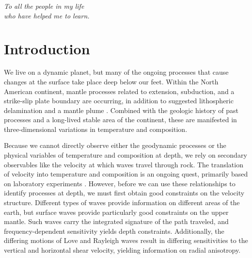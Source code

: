 \documentclass[12pt,oneside]{book}
\begin{document}
\pagebreak

\vspace*{\fill}
\begin{center}
\begingroup
\emph{To all the people in my life \\
who have helped me to learn.\\
}
\endgroup
\end{center}
\vspace*{\fill}

\raggedbottom
\pagebreak

\mainmatter

\singlespacing
\chapter{Introduction}
\label{ch:intro}
\doublespacing

\pagestyle{fancy}
\chead{}
\cfoot{\thepage}
\renewcommand{\headrulewidth}{0pt} %
\thispagestyle{fancy}

We live on a dynamic planet, but many of the ongoing processes that cause changes at the surface take place deep below our feet. Within the North American continent, mantle processes related to extension, subduction, and a strike-slip plate boundary \citep{Fordetal2014} are occurring, in addition to suggested lithospheric delamination \citep[e.g.,][]{Jonesetal1994, Zandtetal2004, Levanderetal2011} and a mantle plume \citep[e.g.,][]{ThompsonGibson1991, Parsonsetal1994, Waiteetal2006, Smithetal2009, Fouch2012}. Combined with the geologic history of past processes and a long-lived stable area of the continent, these are manifested in three-dimensional variations in temperature and composition. 

Because we cannot directly observe either the geodynamic processes or the physical variables of temperature and composition at depth, we rely on secondary observables like the velocity at which waves travel through rock. The translation of velocity into temperature and composition is an ongoing quest, primarily based on laboratory experiments \citep[e.g.,][]{Jordan1979, Trampertetal2001, Cammaranoetal2003, Xuetal2008}. However, before we can use these relationships to identify processes at depth, we must first obtain good constraints on the velocity structure. Different types of waves provide information on different areas of the earth, but surface waves provide particularly good constraints on the upper mantle. Such waves carry the integrated signature of the path traveled, and frequency-dependent sensitivity yields depth constraints. Additionally, the differing motions of Love and Rayleigh waves result in differing sensitivities to the vertical and horizontal shear velocity, yielding information on radial anisotropy. 
\end{document}
